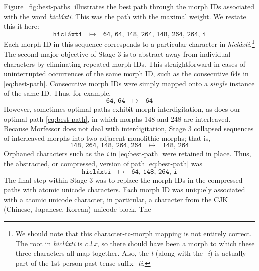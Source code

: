 {Figure~\ref{fig:best-paths} illustrates the 
 best path through the morph IDs associated with the word \textit{hicl\'{a}xti}. This was the path with
 the maximal weight.
 We restate this it here:
\begin{equation}\label{eq:best-path} 
\texttt{hicl\'{a}xti} \quad \mapsto \quad \texttt{64, 64, 148, 264, 148, 264, 264, i}
\end{equation}
Each morph ID in this sequence corresponds to a particular character in \textit{hicl\'{a}xti}.\footnote{We should note that this character-to-morph mapping is not entirely correct. The root in \textit{hicl\'{a}xti} is \textit{c.l.x}, so there should have been a morph to which these three characters all map together. Also, the \textit{t} (along with the \textit{-i}) is actually part of the 1st-person past-tense suffix \textit{-ti}.}
The second major objective of Stage 3 is to abstract away from individual 
characters by eliminating repeated morph IDs. 
This straightforward in cases of uninterrupted 
occurrences of the same morph ID, such as the consecutive 64s in \eqref{eq:best-path}. 
Consecutive morph IDs were simply mapped onto a \emph{single} instance of the same ID. Thus, for example,
\begin{equation*}
\texttt{64, 64} \quad \mapsto \quad \texttt{64}
\end{equation*}
However, sometimes optimal paths
exhibit morph interdigitation, as does our optimal path \eqref{eq:best-path}, in which morphs 148 and 248 are interleaved. 
Because Morfessor does not deal 
with interdigitation, Stage 3 collapsed sequences of interleaved morphs into two adjacent monolithic
morphs; that is, 
\begin{equation*}
\texttt{148, 264, 148, 264, 264} \quad \mapsto \quad \texttt{148, 264}
\end{equation*}
Orphaned characters such as the \textit{i} in \eqref{eq:best-path} 
were retained in place. Thus, the abstracted, or compressed, version of path \eqref{eq:best-path} was
\begin{equation}\label{eq:reduced-best-path}
\texttt{hicl\'{a}xti} \quad \mapsto \quad \texttt{64, 148, 264, i}
\end{equation}
The final step within Stage 3 was to replace the morph IDs in the compressed paths 
with atomic unicode characters. Each morph ID was uniquely associated with a atomic unicode character, in particular, a character 
from the CJK (Chinese, Japanese, Korean) unicode block. The 
}
